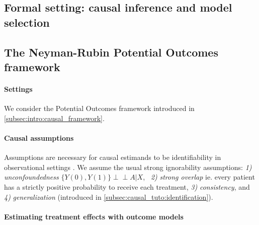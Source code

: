 \documentclass[french,12pt,twoside,a4paper]{book}
\newcommand{\indep}{\perp \!\!\! \perp}
\begin{document}
\begin{background_box_left}

  \section{Formal setting: causal inference and model selection}%
  \label{sec:causal_model_selection:setting}%

  \subsection{The Neyman-Rubin Potential Outcomes framework}%
  \label{subsec:causal_model_selection:framework}%

  \paragraph{Settings} We consider the Potential Outcomes framework introduced in
  \ref{subsec:intro:causal_framework}.

  \paragraph{Causal assumptions}\label{par:causal_assumptions}

  Assumptions are necessary for causal estimands to be
  identifiability
  in observational settings \citep{rubin_causal_2005}. We assume the usual
  strong ignorability assumptions: \emph{1)}
  \emph{unconfoundedness} \mbox{$\{Y(0),
      Y(1) \} \indep A | X$}, \emph{~2)} \emph{strong overlap} ie. every patient has a
  strictly positive probability to receive each treatment, \emph{3)}
  \emph{consistency}, and \emph{4)} \emph{generalization} (introduced in
  \ref{subsec:causal_tuto:identification}).

  \paragraph{Estimating treatment effects with outcome models}\label{subsec:estimators}


\end{background_box_left}
\end{document}

